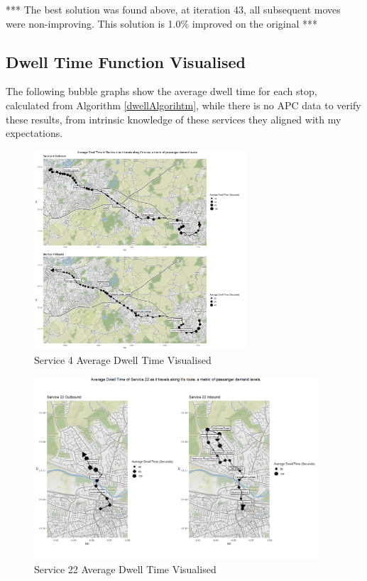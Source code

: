 \documentclass{article}
\begin{document}
*** The best solution was found above, at iteration 43, all subsequent moves were non-improving. This solution is 1.0\% improved on the original ***

\subsection{Dwell Time Function Visualised}
The following bubble graphs show the average dwell time for each stop, calculated from Algorithm \ref{dwellAlgorihtm}, while there is no APC data to verify these results, from intrinsic knowledge of these services they aligned with my expectations.  

\begin{figure}[H]
	\centering
	\includegraphics[width=300px]{images/bublechart_4_pair_map.png}
	\caption{Service 4 Average Dwell Time Visualised }
	\label{fig:4dwell}
\end{figure}


\begin{figure}[H]
	\centering
	\includegraphics[width=400px]{images/bublechart_22_pair_map.png}
	\caption{Service 22 Average Dwell Time Visualised}
	\label{fig:22dwell}
\end{figure}
\end{document}
